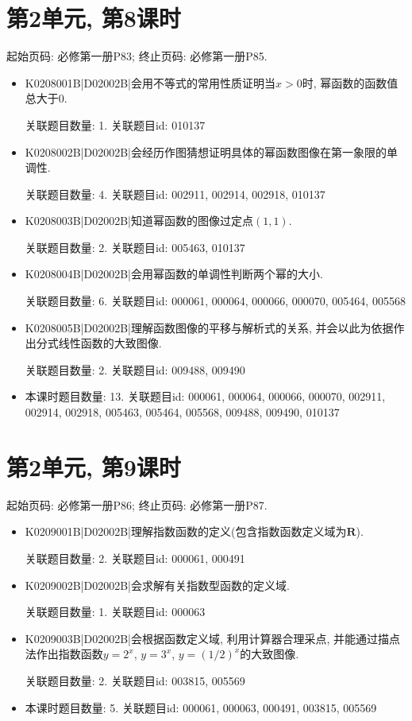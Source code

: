 \section*{第2单元, 第8课时}
起始页码: 必修第一册P83; 终止页码: 必修第一册P85.
\begin{itemize}
\item K0208001B|D02002B|会用不等式的常用性质证明当$x>0$时, 幂函数的函数值总大于$0$.

关联题目数量: 1. 关联题目id: 010137

\item K0208002B|D02002B|会经历作图猜想证明具体的幂函数图像在第一象限的单调性.

关联题目数量: 4. 关联题目id: 002911, 002914, 002918, 010137

\item K0208003B|D02002B|知道幂函数的图像过定点$(1,1)$.

关联题目数量: 2. 关联题目id: 005463, 010137

\item K0208004B|D02002B|会用幂函数的单调性判断两个幂的大小.

关联题目数量: 6. 关联题目id: 000061, 000064, 000066, 000070, 005464, 005568

\item K0208005B|D02002B|理解函数图像的平移与解析式的关系, 并会以此为依据作出分式线性函数的大致图像.

关联题目数量: 2. 关联题目id: 009488, 009490

\item 本课时题目数量: 13. 关联题目id: 000061, 000064, 000066, 000070, 002911, 002914, 002918, 005463, 005464, 005568, 009488, 009490, 010137

\end{itemize}

\section*{第2单元, 第9课时}
起始页码: 必修第一册P86; 终止页码: 必修第一册P87.
\begin{itemize}
\item K0209001B|D02002B|理解指数函数的定义(包含指数函数定义域为$\mathbf{R}$).

关联题目数量: 2. 关联题目id: 000061, 000491

\item K0209002B|D02002B|会求解有关指数型函数的定义域.

关联题目数量: 1. 关联题目id: 000063

\item K0209003B|D02002B|会根据函数定义域, 利用计算器合理采点, 并能通过描点法作出指数函数$y=2^{x}$, $y=3^{x}$, $y=(1/2)^{x}$的大致图像.

关联题目数量: 2. 关联题目id: 003815, 005569

\item 本课时题目数量: 5. 关联题目id: 000061, 000063, 000491, 003815, 005569

\end{itemize}

